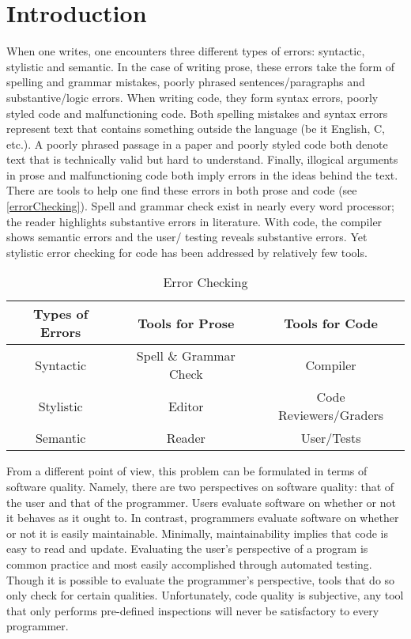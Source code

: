 \documentclass[12pt]{report}
\begin{document}
\tableofcontents
\listoftables
\listoffigures

\cleardoublepage
{}
\pagestyle{fancy}
\doublespacing

\chapter{Introduction}

When one writes, one encounters three different types of errors: syntactic, stylistic and semantic.  
In the case of writing prose, these errors take the form of spelling and grammar mistakes, poorly phrased 
sentences\slash paragraphs and substantive\slash logic errors. When writing code, they form syntax 
errors, poorly styled code and malfunctioning code. Both spelling mistakes and syntax errors represent 
text that contains something outside the language (be it English, C, etc.). A poorly phrased passage in a 
paper and poorly styled code both denote text that is technically valid but hard to understand. Finally, 
illogical arguments in prose and malfunctioning code both imply errors in the ideas behind the text. 
There are tools to help one find these errors in both prose and code (see \autoref{errorChecking}). 
Spell and grammar check exist in nearly every word processor; the reader highlights substantive 
errors in literature. With code, the compiler shows semantic errors and the user\slash 
testing reveals substantive errors. Yet stylistic error checking for code has been addressed by 
relatively few tools. 

\begin{table}%
	\begin{center}
	\begin{tabular}{ccc}
		\toprule
		Types of Errors & Tools for Prose & Tools for Code \\
		\midrule
		Syntactic & Spell \& Grammar Check & Compiler \\
		Stylistic & Editor & Code Reviewers\slash Graders \\ 
		Semantic & Reader & User\slash Tests \\
		\bottomrule
	\end{tabular}
	\end{center}
	\caption{Error Checking}
	\label{errorChecking}
\end{table}


From a different point of view, this problem can be formulated in terms of software quality. 
Namely, there are two perspectives on software quality: that of the user and that of the programmer. 
Users evaluate software on whether or not it behaves as it ought to. In contrast, programmers evaluate 
software on whether or not it is easily maintainable. Minimally, maintainability implies that 
code is easy to read and update. Evaluating the user's perspective of a program is common practice and 
most easily accomplished through automated testing. Though it is possible to evaluate the programmer's 
perspective, tools that do so only check for certain qualities. Unfortunately, code quality is 
subjective, any tool that only performs pre-defined inspections will never be satisfactory to every 
programmer.
\end{document}
